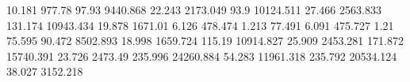 10.181     977.78     %
97.93      9440.868   %
22.243     2173.049   %
93.9       10124.511  %
27.466     2563.833   %
131.174    10943.434  %
19.878     1671.01    %
6.126      478.474    %
1.213      77.491     %
6.091      475.727    %
1.21       75.595     %
90.472     8502.893   %
18.998     1659.724   %
115.19     10914.827  %
25.909     2453.281   %
171.872    15740.391  %
23.726     2473.49    %
235.996    24260.884  %
54.283     11961.318  %
235.792    20534.124  %
38.027     3152.218   %
